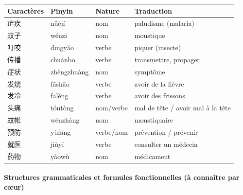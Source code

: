 \documentclass[11pt]{article}
\begin{document}
\begin{bilan}
\begin{center}
\begin{tabularx}{\linewidth}{|X|X|X|X|}
\hline
\rowcolor{poporangeL} \textbf{Caractères} & \textbf{Pinyin} & \textbf{Nature} & \textbf{Traduction} \\ \hline
疟疾 & nüèjí & nom & paludisme (malaria) \\ \hline
蚊子 & wénzi & nom & moustique \\ \hline
叮咬 & dīngyǎo & verbe & piquer (insecte) \\ \hline
传播 & chuánbō & verbe & transmettre, propager \\ \hline
症状 & zhèngzhuàng & nom & symptôme \\ \hline
发烧 & fāshāo & verbe & avoir de la fièvre \\ \hline
发冷 & fālěng & verbe & avoir des frissons \\ \hline
头痛 & tóutòng & nom/verbe & mal de tête / avoir mal à la tête \\ \hline
蚊帐 & wénzhàng & nom & moustiquaire \\ \hline
预防 & yùfáng & verbe/nom & prévention / prévenir \\ \hline
就医 & jiùyī & verbe & consulter un médecin \\ \hline
药物 & yàowù & nom & médicament \\ \hline
\end{tabularx}
\end{center}

\paragraph{Structures grammaticales et formules fonctionnelles (à connaître par cœur)}


\end{bilan}
\end{document}
